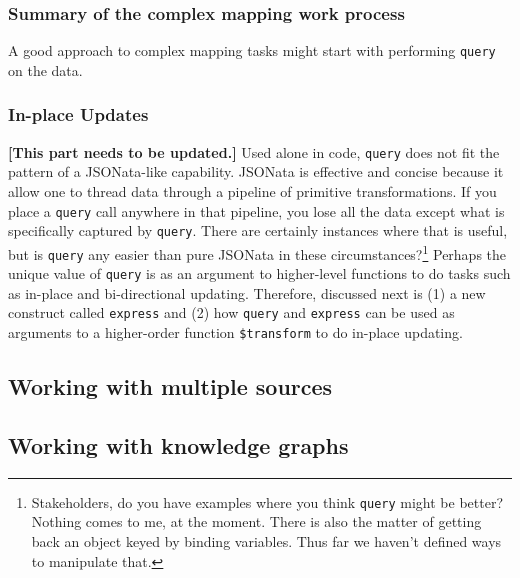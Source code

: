 \documentclass[9pt,letterpaper]{article}
\newcommand{\stt}[1]{\texttt{#1}} %
\begin{document}
\subsubsection{Summary of the complex mapping work process}
A good approach to complex mapping tasks might start with performing \stt{query} on the data.


\subsubsection{In-place Updates}

\textbf{[This part needs to be updated.]} Used alone in code, \stt{query} does not fit the pattern of a JSONata-like capability.
JSONata is effective and concise because it allow one to thread data through a pipeline of primitive transformations.
If you place a \stt{query} call anywhere in that pipeline, you lose all the data except what is specifically captured by \stt{query}.
There are certainly instances where that is useful, but is \stt{query} any easier than pure JSONata in these circumstances?\footnote{Stakeholders, do you have
  examples where you think \stt{query} might be better?
  Nothing comes to me, at the moment.
  There is also the matter of getting back an object keyed by binding variables.
  Thus far we haven't defined ways to manipulate that.}
Perhaps the unique value of \stt{query} is as an argument to higher-level functions to do tasks such as in-place and bi-directional updating.
Therefore, discussed next is (1) a new construct called \stt{express} and (2) how \stt{query} and \stt{express} can be used as arguments to a higher-order function \stt{\$transform} to do in-place updating.

\subsection{Working with multiple sources}

\subsection{Working with knowledge graphs}
\end{document}
